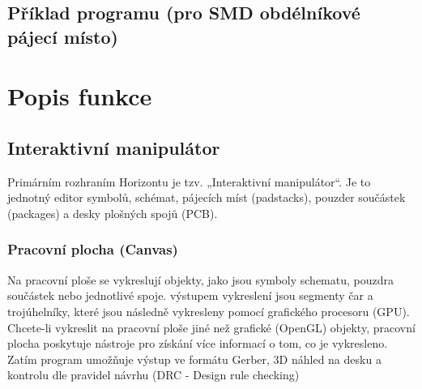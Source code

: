 \documentclass[letterpaper,10pt,czech]{sphinxmanual}
\begin{document}
\section{Příklad programu (pro SMD obdélníkové pájecí místo)}
\label{\detokenize{parameter-programs:priklad-programu-pro-smd-obdelnikove-pajeci-misto}}
\begin{sphinxVerbatim}[commandchars=\\\{\}]
 \PYG{p}{[}  \PYG{p}{]}
 \PYG{p}{[}  \PYG{p}{]}
 
 \PYG{p}{[}   \PYG{p}{]}
 \PYG{p}{[}  \PYG{p}{]}
 
 \PYG{p}{[}   \PYG{p}{]}

 \PYG{p}{[}  \PYG{p}{]}
 
 \PYG{p}{[}   \PYG{p}{]}
\end{sphinxVerbatim}


\chapter{Popis funkce}
\label{\detokenize{theory-of-operation:popis-funkce}}\label{\detokenize{theory-of-operation::doc}}

\section{Interaktivní manipulátor}
\label{\detokenize{theory-of-operation:interaktivni-manipulator}}
Primárním rozhraním Horizontu je tzv. „Interaktivní manipulátor“.
Je to jednotný editor symbolů, schémat, pájecích míst (padstacks),
pouzder součástek (packages) a desky plošných spojů (PCB).


\subsection{Pracovní plocha (Canvas)}
\label{\detokenize{theory-of-operation:pracovni-plocha-canvas}}
Na pracovní ploše se vykreslují objekty, jako jsou symboly schematu, pouzdra součástek nebo jednotlivé spoje.
výstupem vykreslení jsou segmenty čar a trojúhelníky, které jsou následně vykresleny pomocí grafického procesoru (GPU).
Chcete-li vykreslit na pracovní ploše jiné než grafické (OpenGL) objekty,
pracovní plocha poskytuje nástroje pro získání více informací o tom, co je
vykresleno. Zatím program umožňuje výstup ve formátu Gerber, 3D náhled na desku a kontrolu dle pravidel návrhu
(DRC - Design rule checking)
\end{document}
